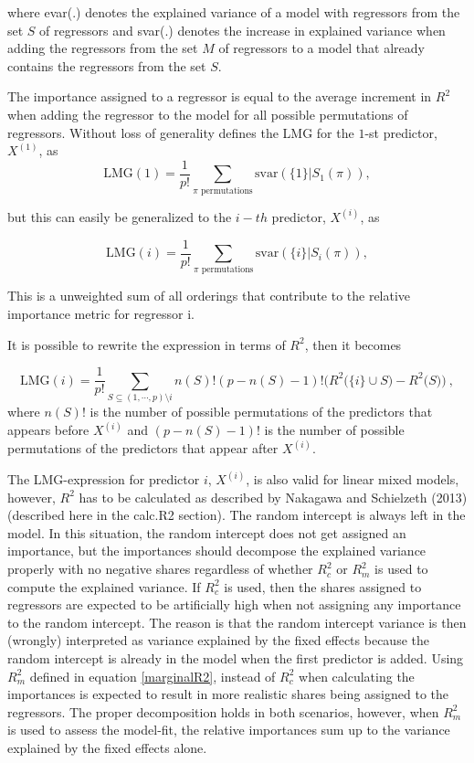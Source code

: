 \documentclass[
]{article}
\begin{document}
where evar(.) denotes the explained variance of a model with regressors
from the set \(S\) of regressors and svar(.) denotes the increase in
explained variance when adding the regressors from the set \(M\) of
regressors to a model that already contains the regressors from the set
\(S\).

The importance assigned to a regressor is equal to the average increment
in \(R^2\) when adding the regressor to the model for all possible
permutations of regressors. Without loss of generality
\cite{statPractice2007} defines the LMG for the \(1\)-st predictor,
\(X^{(1)}\), as \begin{equation}
    \textrm{LMG}(1) = \frac{1}{p!} \sum_{\pi\textrm{ permutations}} \textrm{svar}(\{1\}|S_1(\pi)),
\end{equation}

but this can easily be generalized to the \(i-th\) predictor,
\(X^{(i)}\), as

\begin{equation}
    \textrm{LMG}(i) = \frac{1}{p!} \sum_{\pi\textrm{ permutations}} \textrm{svar}(\{i\}|S_i(\pi)),
    \label{LMG1}
\end{equation}

This is a unweighted sum of all orderings that contribute to the
relative importance metric for regressor i.

It is possible to rewrite the expression in terms of \(R^2\), then it
becomes

\begin{equation}
     \textrm{LMG}(i) = \frac{1}{p!} \sum_{S \subseteq (1,\cdots, p) \setminus i} n(S)!(p-n(S)-1)! \bigg(R^2\big(\{i\}\cup S\big) - R^2\big(S\big)\bigg)\ ,
     \label{LMG_fast}
\end{equation} where \(n(S)!\) is the number of possible permutations of
the predictors that appears before \(X^{(i)}\) and \((p-n(S)-1)!\) is
the number of possible permutations of the predictors that appear after
\(X^{(i)}\).

The LMG-expression for predictor \(i\), \(X^{(i)}\), is also valid for
linear mixed models, however, \(R^2\) has to be calculated as described
by Nakagawa and Schielzeth (2013) (described here in the calc.R2
section). The random intercept is always left in the model. In this
situation, the random intercept does not get assigned an importance, but
the importances should decompose the explained variance properly with no
negative shares regardless of whether \(R^2_c\) or \(R^2_m\) is used to
compute the explained variance. If \(R^2_c\) is used, then the shares
assigned to regressors are expected to be artificially high when not
assigning any importance to the random intercept. The reason is that the
random intercept variance is then (wrongly) interpreted as variance
explained by the fixed effects because the random intercept is already
in the model when the first predictor is added. Using \(R^2_m\) defined
in equation \eqref{marginalR2}, instead of \(R^2_c\) when calculating
the importances is expected to result in more realistic shares being
assigned to the regressors. The proper decomposition holds in both
scenarios, however, when \(R^2_m\) is used to assess the model-fit, the
relative importances sum up to the variance explained by the fixed
effects alone.
\end{document}
